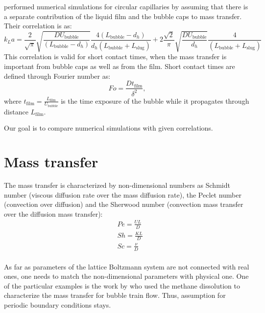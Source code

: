 \documentclass{article}
\begin{document}
\citet{vanbaten-circular} performed numerical simulations for circular capillaries by assuming that
there is a separate contribution of the liquid film and the bubble caps to mass transfer. Their
correlation is as:
\begin{equation}
k_L a = \frac{2}{\sqrt{\pi}}\sqrt{\frac{D U_{\mathrm{bubble}}}{(L_{\mathrm{bubble}}-d_h)}}
\frac{4(L_{\mathrm{bubble}}-d_h)}{d_h(L_{\mathrm{bubble}}+L_{\mathrm{slug}})}+2\frac{\sqrt{2}}{\pi}
 \sqrt{\frac{D U_{\mathrm{bubble}}}{d_h}} \frac{4}{(L_{\mathrm{bubble}}+L_{\mathrm{slug}})}
\end{equation}
This correlation is valid for short contact times, when the mass transfer is important from bubble
caps as well as from the film. Short contact times are defined through Fourier number as:
\begin{equation}
Fo=\frac{D t_{\mathrm{film}}}{\delta^2},
\end{equation}
where $t_{\mathrm{film}}=\frac{L_{\mathrm{film}}}{U_{\mathrm{bubble}}}$ is the time exposure of the
bubble while it propagates through distance $L_{\mathrm{film}}$. 

Our goal is to compare numerical simulations with given correlations.

\section{Mass transfer}
The mass transfer is characterized by non-dimensional numbers as Schmidt number (viscous diffusion
rate over the mass diffusion rate), the Peclet number (convection over diffusion) and the Sherwood
number (convection mass transfer over the diffusion mass transfer):
\begin{equation}
\begin{aligned}
&Pe=\frac{U L}{D}\\
&Sh=\frac{K L}{D}\\
&Sc=\frac{\nu}{D}\\
\end{aligned}
\end{equation}

As far as parameters of the lattice Boltzmann system are not connected with real ones, one needs to
match the non-dimensional parameters with physical one.  One of the particular examples is the
work by \citet{bercic-mass} who used the methane dissolution to characterize the mass transfer for
bubble train flow. Thus, assumption for periodic boundary conditions stays. 
\end{document}
